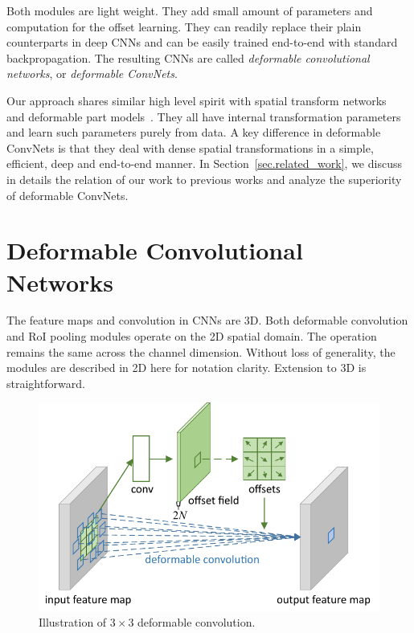 \documentclass[10pt,twocolumn,letterpaper]{article}
\begin{document}
Both modules are light weight. They add small amount of parameters and computation for the offset learning. They can readily replace their plain counterparts in deep CNNs and can be easily trained end-to-end with standard backpropagation. The resulting CNNs are called \emph{deformable convolutional networks}, or \emph{deformable ConvNets}.

Our approach shares similar high level spirit with spatial transform networks~\cite{Jaderberg2015} and deformable part models~\cite{pedro2010dpm}. They all have internal transformation parameters and learn such parameters purely from data. A key difference in deformable ConvNets is that they deal with dense spatial transformations in a simple, efficient, deep and end-to-end manner. In Section~\ref{sec.related_work}, we discuss in details the relation of our work to previous works and analyze the superiority of deformable ConvNets.

\section{Deformable Convolutional Networks}

The feature maps and convolution in CNNs are 3D. Both deformable convolution and RoI pooling modules operate on the 2D spatial domain. The operation remains the same across the channel dimension. Without loss of generality, the modules are described in 2D here for notation clarity. Extension to 3D is straightforward.

\begin{figure}
  \centering
  \includegraphics[width=\linewidth]{deform_conv_layer_v7.pdf}
\caption{Illustration of $3\times 3$ deformable convolution.}
\label{fig.deformable_convolution_structure}
\end{figure}
\end{document}
